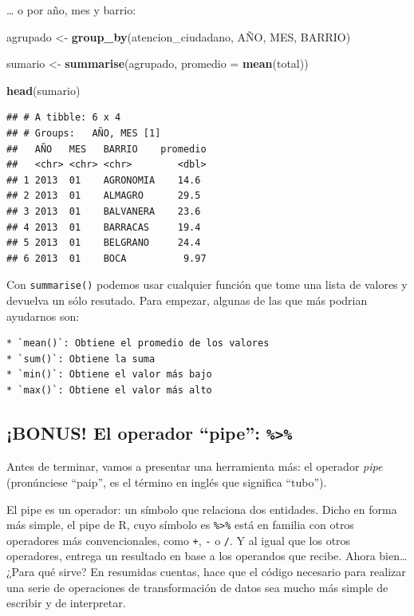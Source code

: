 \documentclass[]{book}
\newenvironment{Shaded}{\begin{snugshade}}{\end{snugshade}}
\newcommand{\KeywordTok}[1]{\textcolor[rgb]{0.13,0.29,0.53}{\textbf{#1}}}
\newcommand{\DataTypeTok}[1]{\textcolor[rgb]{0.13,0.29,0.53}{#1}}
\newcommand{\StringTok}[1]{\textcolor[rgb]{0.31,0.60,0.02}{#1}}
\newcommand{\NormalTok}[1]{#1}
\begin{document}
\ldots{} o por año, mes y barrio:

\begin{Shaded}
\begin{Highlighting}[]
\NormalTok{agrupado <-}\StringTok{ }\KeywordTok{group_by}\NormalTok{(atencion_ciudadano, AÑO, MES, BARRIO)}

\NormalTok{sumario <-}\StringTok{ }\KeywordTok{summarise}\NormalTok{(agrupado, }\DataTypeTok{promedio =} \KeywordTok{mean}\NormalTok{(total))}

\KeywordTok{head}\NormalTok{(sumario)}
\end{Highlighting}
\end{Shaded}

\begin{verbatim}
## # A tibble: 6 x 4
## # Groups:   AÑO, MES [1]
##   AÑO   MES   BARRIO    promedio
##   <chr> <chr> <chr>        <dbl>
## 1 2013  01    AGRONOMIA    14.6 
## 2 2013  01    ALMAGRO      29.5 
## 3 2013  01    BALVANERA    23.6 
## 4 2013  01    BARRACAS     19.4 
## 5 2013  01    BELGRANO     24.4 
## 6 2013  01    BOCA          9.97
\end{verbatim}

Con \texttt{summarise()} podemos usar cualquier función que tome una
lista de valores y devuelva un sólo resutado. Para empezar, algunas de
las que más podrian ayudarnos son:

\begin{verbatim}
* `mean()`: Obtiene el promedio de los valores
* `sum()`: Obtiene la suma
* `min()`: Obtiene el valor más bajo
* `max()`: Obtiene el valor más alto
\end{verbatim}

\subsection{\texorpdfstring{¡BONUS! El operador ``pipe'':
\texttt{\%\textgreater{}\%}}{¡BONUS! El operador pipe: \%\textgreater{}\%}}\label{bonus-el-operador-pipe}

Antes de terminar, vamos a presentar una herramienta más: el operador
\emph{pipe} (pronúnciese ``paip'', es el término en inglés que significa
``tubo'').

El pipe es un operador: un símbolo que relaciona dos entidades. Dicho en
forma más simple, el pipe de R, cuyo símbolo es
\texttt{\%\textgreater{}\%} está en familia con otros operadores más
convencionales, como \texttt{+}, \texttt{-} o \texttt{/}. Y al igual que
los otros operadores, entrega un resultado en base a los operandos que
recibe. Ahora bien\ldots{} ¿Para qué sirve? En resumidas cuentas, hace
que el código necesario para realizar una serie de operaciones de
transformación de datos sea mucho más simple de escribir y de
interpretar.
\end{document}
